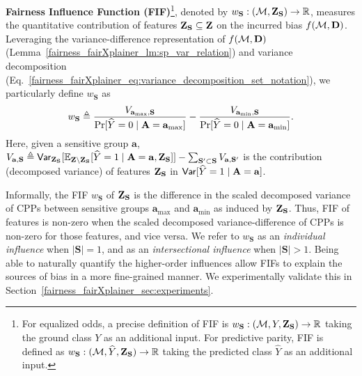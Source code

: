 \begin{definition} \textbf{Fairness Influence Function (FIF)}\footnote{For equalized odds, a precise definition of FIF is $ w_{\mathbf{S}}: (\mathcal{M}, Y, \mathbf{Z}_{\mathbf{S}}) \rightarrow \mathbb{R} $ taking the ground class $ Y $ as an additional input. For predictive parity, FIF is defined as $ w_{\mathbf{S}}: (\mathcal{M}, \widehat{Y}, \mathbf{Z}_{\mathbf{S}}) \rightarrow \mathbb{R} $ taking the predicted class $ \widehat{Y} $ as an additional input.}, denoted by $ w_{\mathbf{S}}: (\mathcal{M}, \mathbf{Z}_{\mathbf{S}}) \rightarrow \mathbb{R} $, measures the quantitative contribution of features $ \mathbf{Z}_{\mathbf{S}} \subseteq \mathbf{Z} $ on the incurred bias $ f(\mathcal{M}, \mathbf{D}) $. Leveraging the variance-difference representation of $ f(\mathcal{M}, \mathbf{D}) $ (Lemma~\ref{fairness_fairXplainer_lm:sp_var_relation}) and variance decomposition (Eq.~\eqref{fairness_fairXplainer_eq:variance_decomposition_set_notation}), we particularly define $ w_{\mathbf{S}} $ as
\begin{equation}\label{fairness_fairXplainer_eq:fif_decompose}
	w_{\mathbf{S}}  \triangleq \frac{V_{\mathbf{a}_{\max}, \mathbf{S}}}{ \Pr[\widehat{Y} = 0 \mid  \mathbf{A} = \mathbf{a}_{\max}]} - \frac{V_{\mathbf{a}_{\min}, \mathbf{S}} }{\Pr[\widehat{Y} = 0 \mid  \mathbf{A} = \mathbf{a}_{\min}]}.
\end{equation}
Here, given a sensitive group $ \mathbf{a} $, $ V_{\mathbf{a}, \mathbf{S}} \triangleq  \mathsf{Var} _{\mathbf{Z}_{\mathbf{S}}}[\mathbb{E}_{\mathbf{Z}\setminus\mathbf{Z}_{\mathbf{S}}}[\widehat{Y} = 1\mid \mathbf{A} = \mathbf{a}, \mathbf{Z}_{\mathbf{S}}]]- \sum_{\mathbf{S}' \subset \mathbf{S}}{V} _{\mathbf{a}, \mathbf{S}'} $ is the contribution (decomposed variance) of features $ \mathbf{Z}_{\mathbf{S}} $ in $ \mathsf{Var}[\widehat{Y} = 1\mid\mathbf{A} = \mathbf{a}] $.
\end{definition}	

Informally, the FIF $ w_{\mathbf{S}} $ of $ \mathbf{Z}_{\mathbf{S}} $ is the difference in the scaled decomposed variance of CPPs between sensitive groups $ \mathbf{a}_{\max} $ and $ \mathbf{a}_{\min} $ as induced by  $ \mathbf{Z}_{\mathbf{S}} $. Thus, FIF of features is non-zero when the scaled decomposed variance-difference of CPPs is non-zero for those features, and vice versa. We refer to $ w_{\mathbf{S}} $ as an \emph{individual influence} when $ |\mathbf{S}| = 1 $, and as an \emph{intersectional influence} when $ |\mathbf{S}| > 1 $. Being able to naturally quantify the higher-order influences allow FIFs to explain the sources of bias in a more fine-grained manner. We experimentally validate this in Section~\ref{fairness_fairXplainer_sec:experiments}.
 

